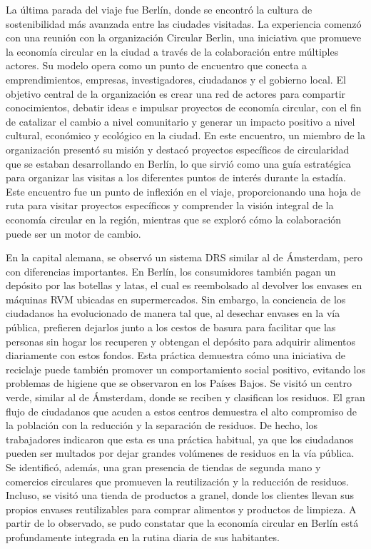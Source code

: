 La última parada del viaje fue Berlín, donde se encontró la cultura de sostenibilidad más avanzada entre las ciudades visitadas. La experiencia comenzó con una reunión con la organización Circular Berlin, una iniciativa que promueve la economía circular en la ciudad a través de la colaboración entre múltiples actores. Su modelo opera como un punto de encuentro que conecta a emprendimientos, empresas, investigadores, ciudadanos y el gobierno local. El objetivo central de la organización es crear una red de actores para compartir conocimientos, debatir ideas e impulsar proyectos de economía circular, con el fin de catalizar el cambio a nivel comunitario y generar un impacto positivo a nivel cultural, económico y ecológico en la ciudad. En este encuentro, un miembro de la organización presentó su misión y destacó proyectos específicos de circularidad que se estaban desarrollando en Berlín, lo que sirvió como una guía estratégica para organizar las visitas a los diferentes puntos de interés durante la estadía. Este encuentro fue un punto de inflexión en el viaje, proporcionando una hoja de ruta para visitar proyectos específicos y comprender la visión integral de la economía circular en la región, mientras que se exploró cómo la colaboración puede ser un motor de cambio.

En la capital alemana, se observó un sistema DRS similar al de Ámsterdam, pero con diferencias importantes. En Berlín, los consumidores también pagan un depósito por las botellas y latas, el cual es reembolsado al devolver los envases en máquinas RVM ubicadas en supermercados. Sin embargo, la conciencia de los ciudadanos ha evolucionado de manera tal que, al desechar envases en la vía pública, prefieren dejarlos junto a los cestos de basura para facilitar que las personas sin hogar los recuperen y obtengan el depósito para adquirir alimentos diariamente con estos fondos. Esta práctica demuestra cómo una iniciativa de reciclaje puede también promover un comportamiento social positivo, evitando los problemas de higiene que se observaron en los Países Bajos. Se visitó un centro verde, similar al de Ámsterdam, donde se reciben y clasifican los residuos. El gran flujo de ciudadanos que acuden a estos centros demuestra el alto compromiso de la población con la reducción y la separación de residuos. De hecho, los trabajadores indicaron que esta es una práctica habitual, ya que los ciudadanos pueden ser multados por dejar grandes volúmenes de residuos en la vía pública. Se identificó, además, una gran presencia de tiendas de segunda mano y comercios circulares que promueven la reutilización y la reducción de residuos. Incluso, se visitó una tienda de productos a granel, donde los clientes llevan sus propios envases reutilizables para comprar alimentos y productos de limpieza. A partir de lo observado, se pudo constatar que la economía circular en Berlín está profundamente integrada en la rutina diaria de sus habitantes.

